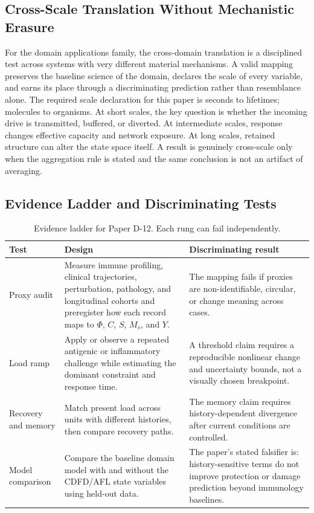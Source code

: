 \documentclass[11pt,a4paper]{article}
\begin{document}
\subsection{Cross-Scale Translation Without Mechanistic Erasure}

For the domain applications family, the cross-domain translation is a disciplined test across systems with very different material mechanisms. A valid mapping preserves the baseline science of the domain, declares the scale of every variable, and earns its place through a discriminating prediction rather than resemblance alone. \cite{Holling1973,Turing1952,Shannon1948,BakTangWiesenfeld1987}
The required scale declaration for this paper is seconds to lifetimes; molecules to organisms. At short
scales, the key question is whether the incoming drive is transmitted,
buffered, or diverted. At intermediate scales, response changes effective
capacity and network exposure. At long scales, retained structure can alter the
state space itself. A result is genuinely cross-scale only when the aggregation
rule is stated and the same conclusion is not an artifact of averaging.

\subsection{Evidence Ladder and Discriminating Tests}

\begin{table}[htbp]
\centering
\small
\caption{Evidence ladder for Paper D-12. Each rung can fail independently.}
\begin{tabularx}{\textwidth}{|p{}|X|X|}
\hline
\textbf{Test} & \textbf{Design} & \textbf{Discriminating result} \\
\hline
Proxy audit & Measure immune profiling, clinical trajectories, perturbation, pathology, and longitudinal cohorts and preregister how each record maps to $\Phi$, $C$, $S$, $M_s$, and $Y$. & The mapping fails if proxies are non-identifiable, circular, or change meaning across cases. \\
\hline
Load ramp & Apply or observe a repeated antigenic or inflammatory challenge while estimating the dominant constraint and response time. & A threshold claim requires a reproducible nonlinear change and uncertainty bounds, not a visually chosen breakpoint. \\
\hline
Recovery and memory & Match present load across units with different histories, then compare recovery paths. & The memory claim requires history-dependent divergence after current conditions are controlled. \\
\hline
Model comparison & Compare the baseline domain model with and without the CDFD/AFL state variables using held-out data. & The paper's stated falsifier is: history-sensitive terms do not improve protection or damage prediction beyond immunology baselines. \\
\hline
\end{tabularx}
\end{table}
\end{document}
